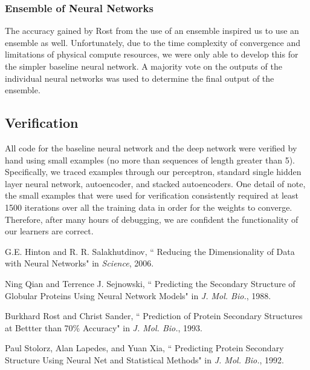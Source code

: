 \documentclass[]{article}
\begin{document}
\subsubsection{Ensemble of Neural Networks}
The accuracy gained by Rost from the use of an ensemble inspired us to use an ensemble as well.
Unfortunately, due to the time complexity of convergence and limitations of physical compute resources, we were only able to develop this for the simpler baseline neural network.
A majority vote on the outputs of the individual neural networks was used to determine the final output of the ensemble.

\subsection{Verification}
All code for the baseline neural network and the deep network were verified by hand using small examples (no more than sequences of length greater than 5).
Specifically, we traced examples through our perceptron, standard single hidden layer neural network, autoencoder, and stacked autoencoders.
One detail of note, the small examples that were used for verification consistently required at least 1500 iterations over all the training data in order for the weights to converge.
Therefore, after many hours of debugging, we are confident the functionality of our learners are correct. 

\begin{thebibliography}{9}

G.E. Hinton and R. R. Salakhutdinov,
   `` Reducing the Dimensionality of Data with Neural Networks"
   in \emph{Science}, 2006.

Ning Qian and Terrence J. Sejnowski,
  `` Predicting the Secondary Structure of Globular Proteins Using Neural Network Models"
  in \emph{J. Mol. Bio.}, 1988.

Burkhard Rost and Christ Sander,
  `` Prediction of Protein Secondary Structures at Bettter than 70\% Accuracy"
  in \emph{J. Mol. Bio.}, 1993.

Paul Stolorz, Alan Lapedes, and Yuan Xia,
   `` Predicting Protein Secondary Structure Using Neural Net and Statistical Methods"
   in \emph{J. Mol. Bio.}, 1992.

\end{thebibliography}
\end{document}
